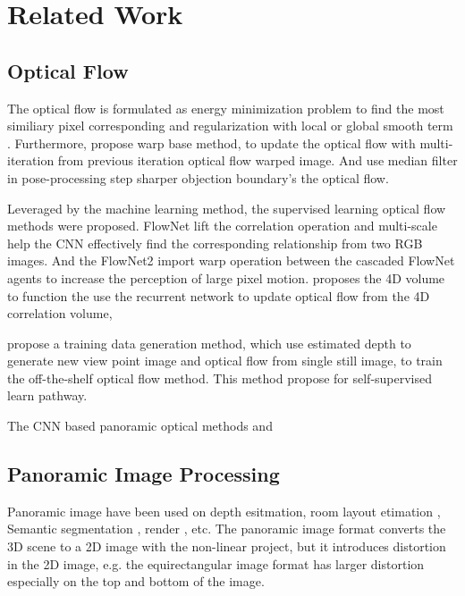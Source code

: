 \section{Related Work}

\subsection{Optical Flow}

The optical flow is formulated as energy minimization problem to find the most similiary pixel corresponding and regularization with local or global smooth term \cite{KroegTDV2016, HornS1981, BA}. 
Furthermore, \citet{BroxBPW2004} propose warp base method, to update the optical flow with multi-iteration from previous iteration optical flow warped image. 
And \cite{SunRB2010} use median filter in pose-processing step sharper objection boundary's the optical flow.

Leveraged by the machine learning method, the supervised learning optical flow methods were proposed.
FlowNet\cite{DosovFIHHGSCB2015} lift the correlation operation and multi-scale help the CNN effectively find the corresponding relationship from two RGB images. And the FlowNet2 \cite{IlgMSKDB2017} import warp operation between the cascaded FlowNet agents to increase the perception of large pixel motion.
%
\citet{SunYLK2020}  proposes the 4D volume to function the 
%
\citet{TeedD2020a} use the recurrent network to update optical flow from the 4D correlation volume, 


\citet{AleotPM2021} propose a training data generation method, 
which use estimated depth to generate new view point image and optical flow from single still image, to train the off-the-shelf optical flow method.
This method propose for self-supervised learn pathway.

The CNN based panoramic optical methods
\citet{artizzu2021omniflownet} and \citet{bhandari2020revisiting}


\subsection{Panoramic Image Processing}

Panoramic image have been used on 
depth esitmation\cite{wang2020360sd}, room layout etimation \cite{wang2021led2, tran2021sslayout360}, Semantic segmentation \cite{yang2021capturing}, render \cite{xu2021layout}, etc.
The panoramic image format converts the 3D scene to a 2D image with the non-linear project, but it introduces distortion in the 2D image, e.g. the equirectangular image format has larger distortion especially on the top and bottom of the image.

